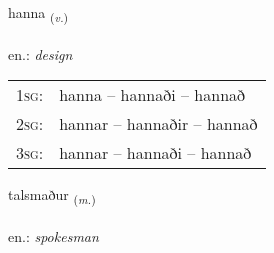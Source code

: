 \documentclass[frontgrid, backgrid]{flacards}\usepackage[]{graphicx}\usepackage[]{xcolor}
\begin{document}
\renewcommand{\flhead}{\vskip5pt \fboxsep=0pt {\small\bfseries\footnotesize Sagnorð | Verb}}
\renewcommand{\fcfoot}{\vskip5pt \fboxsep=0pt \hspace{2pt}{\small\bfseries\footnotesize 2K}}

\renewcommand{\blhead}{\vskip5pt {\small\bfseries\footnotesize Sagnorð | Verb }}
\renewcommand{\bcfoot}{\vskip5pt \hspace{2pt}{\small\bfseries\footnotesize 2K}}


{hanna \small{\textsubscript{(\textit{v.})}} \\[1ex] %
\textphonetic{[hana]} \\
en.: \emph{design} \\  [2ex]
\renewcommand*{\arraystretch}{0.8}
\begin{tabular}{p{1cm}l}
\textsc{1sg}: & hanna -- hannaði -- hannað \\ 
\textsc{2sg}: & hannar -- hannaðir -- hannað \\ 
\textsc{3sg}: & hannar -- hannaði -- hannað \\ 
\end{tabular}
}

\renewcommand{\flhead}{\vskip5pt \fboxsep=0pt {\small\bfseries\footnotesize Nafnorð | Noun}}
\renewcommand{\fcfoot}{\vskip5pt \fboxsep=0pt \hspace{2pt}{\small\bfseries\footnotesize 2K}}

\renewcommand{\blhead}{\vskip5pt {\small\bfseries\footnotesize Nafnorð | Noun }}
\renewcommand{\bcfoot}{\vskip5pt \hspace{2pt}{\small\bfseries\footnotesize 2K}}


{talsmaður \small{\textsubscript{(\textit{m.})}} \\[1ex] %
\textphonetic{[tʰalsmaðʏr]} \\
en.: \emph{spokesman} \\  [2ex]
\renewcommand*{\arraystretch}{0.8}
}
\end{document}

